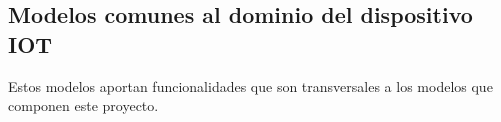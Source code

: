 \subsection{Modelos comunes al dominio del dispositivo IOT}

Estos modelos aportan funcionalidades que son transversales a los modelos que componen este proyecto.



